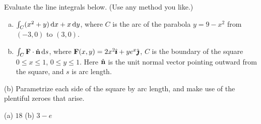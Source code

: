 \begin{question}[M317 2011D] %
Evaluate the line integrals below. (Use any method you like.)
\begin{enumerate}[(a)]
\item
$\int_C (x^2 + y)\,\mathrm{d}x + x\,\mathrm{d}y$, where $C$ is the arc of the parabola 
$y = 9 - x^2$ from $(-3, 0)$ to $(3, 0)$.
\item
$\int_C \mathbf{F} \cdot\hat{\mathbf{n}}\, \mathrm{d}s$, where $\mathbf{F}(x, y) = 2x^2\hat{\pmb{\imath}} + ye^x\hat{\pmb{\jmath}}$, 
$C$ is the boundary of the square $0 \le x \le 1$, $0 \le y \le 1$. Here
$\hat{\mathbf{n}}$ is the unit normal vector pointing outward from the square, and $s$ is arc length.
\end{enumerate}
\end{question}

\begin{hint} 
(b) Parametrize each side of the square by arc length, and make use of the plentiful zeroes that arise.
\end{hint}

\begin{answer} 
(a) $18$\qquad
(b) $3-e$
\end{answer}

